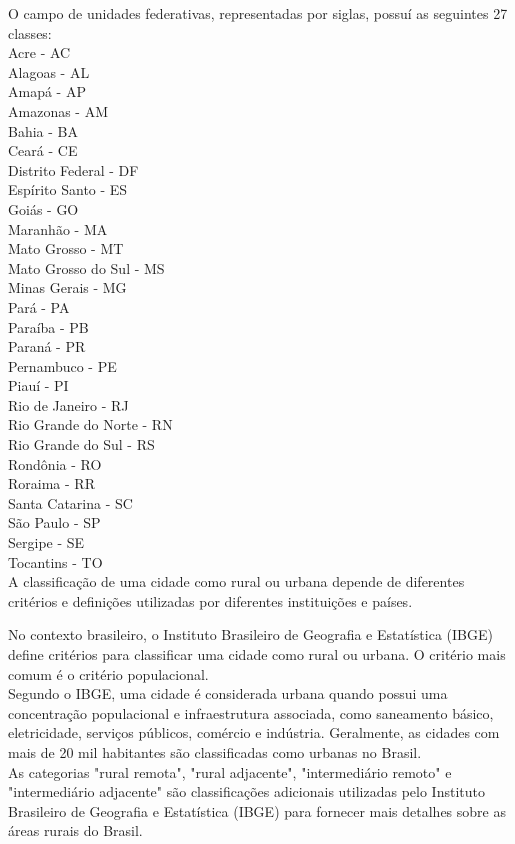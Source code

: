 \documentclass{article}
\begin{document}
O campo de unidades federativas, representadas por siglas, possuí as seguintes 27 classes:\\
Acre - AC\\
Alagoas - AL\\
Amapá - AP\\
Amazonas - AM\\
Bahia - BA\\
Ceará - CE\\
Distrito Federal - DF\\
Espírito Santo - ES\\
Goiás - GO\\
Maranhão - MA\\
Mato Grosso - MT\\
Mato Grosso do Sul - MS\\
Minas Gerais - MG\\
Pará - PA\\
Paraíba - PB\\
Paraná - PR\\
Pernambuco - PE\\
Piauí - PI\\
Rio de Janeiro - RJ\\
Rio Grande do Norte - RN\\
Rio Grande do Sul - RS\\
Rondônia - RO\\
Roraima - RR\\
Santa Catarina - SC\\
São Paulo - SP\\
Sergipe - SE\\
Tocantins - TO\\

A classificação de uma cidade como rural ou urbana depende de diferentes critérios e definições utilizadas por diferentes instituições e países.

No contexto brasileiro, o Instituto Brasileiro de Geografia e Estatística (IBGE) define critérios para classificar uma cidade como rural ou urbana. O critério mais comum é o critério populacional.\\

Segundo o IBGE, uma cidade é considerada urbana quando possui uma concentração populacional e infraestrutura associada, como saneamento básico, eletricidade, serviços públicos, comércio e indústria.
Geralmente, as cidades com mais de 20 mil habitantes são classificadas como urbanas no Brasil.\\


As categorias "rural remota", "rural adjacente", "intermediário remoto" e "intermediário adjacente" são classificações adicionais utilizadas pelo Instituto Brasileiro de Geografia e Estatística (IBGE) para fornecer mais detalhes sobre as áreas rurais do Brasil.
\end{document}
